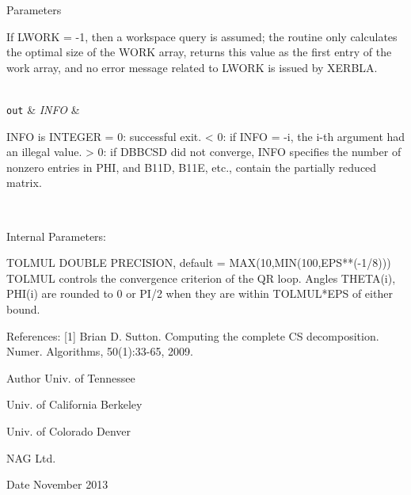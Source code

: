 \begin{DoxyParams}[1]{Parameters}
\begin{DoxyVerb}
          If LWORK = -1, then a workspace query is assumed; the
          routine only calculates the optimal size of the WORK array,
          returns this value as the first entry of the work array, and
          no error message related to LWORK is issued by XERBLA.\end{DoxyVerb}
\\
\hline
\mbox{\tt out}  & {\em I\+N\+F\+O} & \begin{DoxyVerb}          INFO is INTEGER
          = 0:  successful exit.
          < 0:  if INFO = -i, the i-th argument had an illegal value.
          > 0:  if DBBCSD did not converge, INFO specifies the number
                of nonzero entries in PHI, and B11D, B11E, etc.,
                contain the partially reduced matrix.\end{DoxyVerb}
 \\
\hline
\end{DoxyParams}
\begin{DoxyParagraph}{Internal Parameters\+: }
\begin{DoxyVerb}  TOLMUL  DOUBLE PRECISION, default = MAX(10,MIN(100,EPS**(-1/8)))
          TOLMUL controls the convergence criterion of the QR loop.
          Angles THETA(i), PHI(i) are rounded to 0 or PI/2 when they
          are within TOLMUL*EPS of either bound.\end{DoxyVerb}
 
\end{DoxyParagraph}
\begin{DoxyParagraph}{References\+: }
\mbox{[}1\mbox{]} Brian D. Sutton. Computing the complete C\+S decomposition. Numer. Algorithms, 50(1)\+:33-\/65, 2009. 
\end{DoxyParagraph}
\begin{DoxyAuthor}{Author}
Univ. of Tennessee 

Univ. of California Berkeley 

Univ. of Colorado Denver 

N\+A\+G Ltd. 
\end{DoxyAuthor}
\begin{DoxyDate}{Date}
November 2013 
\end{DoxyDate}
